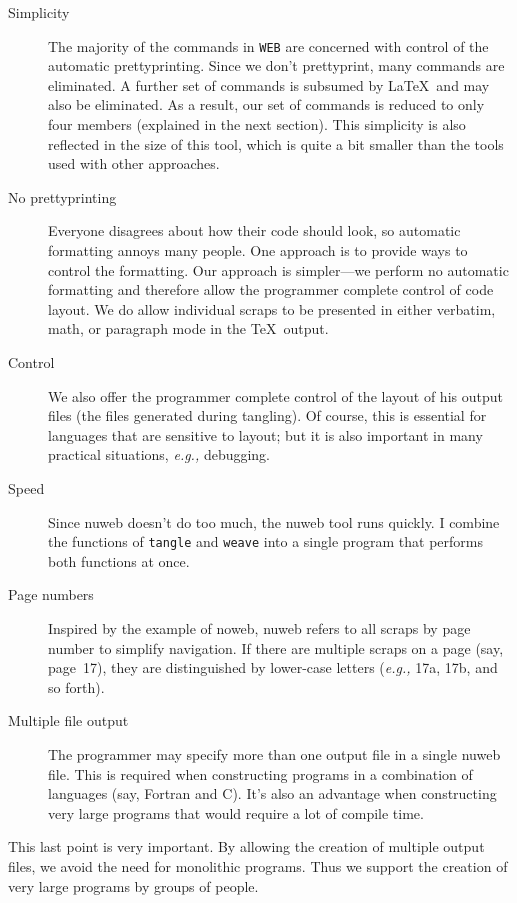 \documentclass[a4paper]{report}
\begin{document}
\begin{description}
\item[Simplicity] The majority of the commands in \verb|WEB| are
  concerned with control of the automatic prettyprinting. Since we
  don't prettyprint, many commands are eliminated. A further set of
  commands is subsumed by \LaTeX\  and may also be eliminated. As a
  result, our set of commands is reduced to only four members (explained
  in the next section). This simplicity is also reflected in
  the size of this tool, which is quite a bit smaller than the tools
  used with other approaches.
\item[No prettyprinting] Everyone disagrees about how their code
  should look, so automatic formatting annoys many people. One approach
  is to provide ways to control the formatting. Our approach is
  simpler---we perform no automatic formatting and therefore allow the
  programmer complete control of code layout.
  We do allow individual scraps to be presented in either verbatim,
  math, or paragraph mode in the \TeX\ output.
\item[Control] We also offer the programmer complete control of the
  layout of his output files (the files generated during tangling). Of
  course, this is essential for languages that are sensitive to layout;
  but it is also important in many practical situations, {\em e.g.,}
  debugging.
\item[Speed] Since nuweb doesn't do too much, the nuweb tool runs
  quickly. I combine the functions of \verb|tangle| and \verb|weave| into
  a single program that performs both functions at once.
\item[Page numbers] Inspired by the example of noweb, nuweb refers to
  all scraps by page number to simplify navigation. If there are
  multiple scraps on a page (say, page~17), they are distinguished by
  lower-case letters ({\em e.g.,} 17a, 17b, and so forth).
\item[Multiple file output] The programmer may specify more than one
  output file in a single nuweb file. This is required when constructing
  programs in a combination of languages (say, Fortran and C)\@. It's also
  an advantage when constructing very large programs that would require
  a lot of compile time.
\end{description}
This last point is very important. By allowing the creation of
multiple output files, we avoid the need for monolithic programs.
Thus we support the creation of very large programs by groups of
people.
\end{document}
